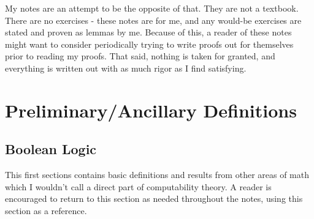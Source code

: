 \documentclass{article}
\theoremstyle{definition}
\theoremstyle{plain}
\theoremstyle{theorem}
\begin{document}
	\par My notes are an attempt to be the opposite of that. They are not a textbook. There are no exercises - these notes are for me, and any would-be exercises are stated and proven as lemmas by me. Because of this, a reader of these notes might want to consider periodically trying to write proofs out for themselves prior to reading my proofs. That said, nothing is taken for granted, and everything is written out with as much rigor as I find satisfying.
\fi
\section{Preliminary/Ancillary Definitions}
\subsection{Boolean Logic}
This first sections contains basic definitions and results from other areas of math which I wouldn't call a direct part of computability theory. A reader is encouraged to return to this section as needed throughout the notes, using this section as a reference.
\end{document}
